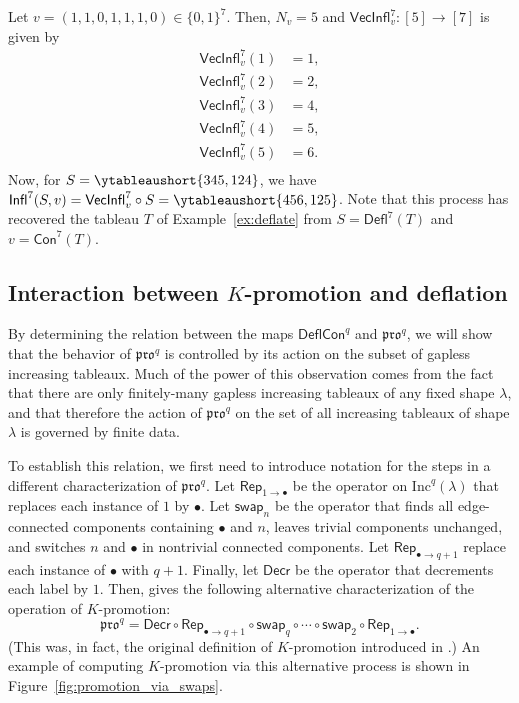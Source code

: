 \documentclass[12pt]{amsart}
\theoremstyle{definition}
\newenvironment{example}
  {\pushQED{\qed}\renewcommand{\qedsymbol}{$\diamondsuit$}\examplex}
  {\popQED\endexamplex}
\theoremstyle{remark}
\numberwithin{equation}{section}
\newcommand{\inc}{\ensuremath{\mathrm{Inc}}}
\newcommand{\pro}{\mathfrak{pro}}
\newcommand{\swap}{\ensuremath{\mathsf{swap}}}
\newcommand{\decr}{\ensuremath{\mathsf{Decr}}}
\newcommand{\rep}{\ensuremath{\mathsf{Rep}}}
\newcommand{\deflate}{\ensuremath{\mathsf{Defl}}}
\newcommand{\inflate}{\ensuremath{\mathsf{VecInfl}}}
\newcommand{\tinflate}{\ensuremath{\mathsf{Infl}}}
\newcommand{\content}{\ensuremath{\mathsf{Con}}}
\newcommand{\compress}{\ensuremath{\mathsf{DeflCon}}}
\begin{document}
\begin{example}\label{ex:reinflate}
Let $v = (1,1,0,1,1,1,0) \in \{0,1\}^7$. Then, $N_v = 5$ and $\inflate^7_v : [5] \to [7]$ is given by 
\begin{align*}
\inflate^7_v(1) &= 1, \\
\inflate^7_v(2) &= 2, \\
\inflate_v^7(3) &= 4, \\
\inflate_v^7(4) &= 5, \\
\inflate_v^7(5) &= 6. \\
\end{align*}
Now, for $S = \ytableaushort{345,124}$, we have $\tinflate^7(S,v) = \inflate^7_v \circ S = \ytableaushort{456,125}$. Note that this process has recovered the tableau $T$ of Example~\ref{ex:deflate} from $S=\deflate^7(T)$ and $v=\content^7(T)$.
\end{example}

\subsection{Interaction between $K$-promotion and deflation}
By determining the relation between the maps $\compress^q$ and $\pro^q$, we will show that the behavior of $\pro^q$ is controlled by its action on the subset of gapless increasing tableaux. Much of the power of this observation comes from the fact that there are only finitely-many gapless increasing tableaux of any fixed shape $\lambda$, and that therefore the action of $\pro^q$ on the set of all increasing tableaux of shape $\lambda$ is governed by finite data.


To establish this relation, we first need to introduce notation for the steps in a different characterization of $\pro^q$. Let $\rep_{1 \rightarrow \bullet}$ be the operator on $\inc^q(\lambda)$ that replaces each instance of $1$ by $\bullet$. Let $\swap_n$ be the operator that finds all edge-connected components containing $\bullet$ and $n$, leaves trivial components unchanged, and switches $n$ and $\bullet$ in nontrivial connected components. Let $\rep_{\bullet \rightarrow q+1}$ replace each instance of $\bullet$ with $q+1$. Finally, let $\decr$ be the operator that decrements each label by $1$. Then, \cite[Proposition~2.4]{DPS} gives the following alternative characterization of the operation of $K$-promotion: 
\begin{equation}\label{eq:kprodef2}
\pro^q = \decr \circ \rep_{\bullet \rightarrow q+1} \circ \swap_q \circ \cdots \circ \swap_2 \circ \rep_{1 \rightarrow \bullet}.
\end{equation}
 (This was, in fact, the original definition of $K$-promotion introduced in \cite{Pechenik}.) An example of computing $K$-promotion via this alternative process is shown in Figure~\ref{fig:promotion_via_swaps}.
 
\end{document}
